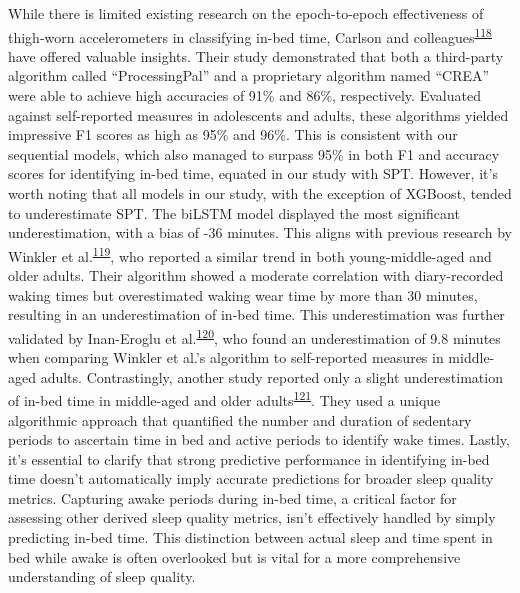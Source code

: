 \documentclass[
  9pt,
]{scrbook}
\begin{document}
While there is limited existing research on the epoch-to-epoch
effectiveness of thigh-worn accelerometers in classifying in-bed time,
Carlson and
colleagues\textsuperscript{\protect\hyperlink{ref-carlson_validity_2021}{118}}
have offered valuable insights. Their study demonstrated that both a
third-party algorithm called ``ProcessingPal'' and a proprietary
algorithm named ``CREA'' were able to achieve high accuracies of 91\%
and 86\%, respectively. Evaluated against self-reported measures in
adolescents and adults, these algorithms yielded impressive F1 scores as
high as 95\% and 96\%. This is consistent with our sequential models,
which also managed to surpass 95\% in both F1 and accuracy scores for
identifying in-bed time, equated in our study with SPT. However, it's
worth noting that all models in our study, with the exception of
XGBoost, tended to underestimate SPT. The biLSTM model displayed the
most significant underestimation, with a bias of -36 minutes. This
aligns with previous research by Winkler et
al.\textsuperscript{\protect\hyperlink{ref-winkler_identifying_2016}{119}},
who reported a similar trend in both young-middle-aged and older adults.
Their algorithm showed a moderate correlation with diary-recorded waking
times but overestimated waking wear time by more than 30 minutes,
resulting in an underestimation of in-bed time. This underestimation was
further validated by Inan-Eroglu et
al.\textsuperscript{\protect\hyperlink{ref-inan-eroglu_comparison_2021}{120}},
who found an underestimation of 9.8 minutes when comparing Winkler et
al.'s algorithm to self-reported measures in middle-aged adults.
Contrastingly, another study reported only a slight underestimation of
in-bed time in middle-aged and older
adults\textsuperscript{\protect\hyperlink{ref-van_der_berg_identifying_2016}{121}}.
They used a unique algorithmic approach that quantified the number and
duration of sedentary periods to ascertain time in bed and active
periods to identify wake times. Lastly, it's essential to clarify that
strong predictive performance in identifying in-bed time doesn't
automatically imply accurate predictions for broader sleep quality
metrics. Capturing awake periods during in-bed time, a critical factor
for assessing other derived sleep quality metrics, isn't effectively
handled by simply predicting in-bed time. This distinction between
actual sleep and time spent in bed while awake is often overlooked but
is vital for a more comprehensive understanding of sleep quality.
\end{document}
